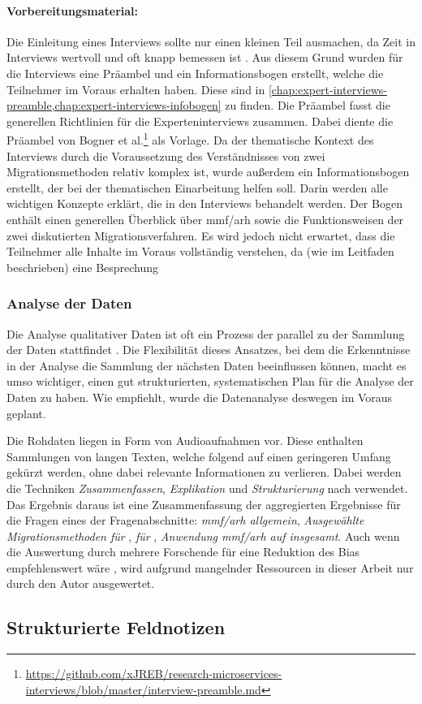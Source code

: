 \paragraph{Vorbereitungsmaterial:} 
Die Einleitung eines Interviews sollte nur einen kleinen Teil ausmachen, da Zeit in Interviews wertvoll und oft knapp bemessen ist \cite{Runeson2009,hove-anda-2005,seaman2008qualitative}.
Aus diesem Grund wurden für die Interviews eine Präambel und ein Informationsbogen erstellt, welche die Teilnehmer im Voraus erhalten haben.
Diese sind in \cref{chap:expert-interviews-preamble,chap:expert-interviews-infobogen} zu finden.
Die Präambel fasst die generellen Richtlinien für die Experteninterviews zusammen.
Dabei diente die Präambel von Bogner et al.\footnote{\url{https://github.com/xJREB/research-microservices-interviews/blob/master/interview-preamble.md}} als Vorlage.
Da der thematische Kontext des Interviews durch die Voraussetzung des Verständnisses von zwei Migrationsmethoden relativ komplex ist, wurde außerdem ein Informationsbogen erstellt, der bei der thematischen Einarbeitung helfen soll.
Darin werden alle wichtigen Konzepte erklärt, die in den Interviews behandelt werden.
Der Bogen enthält einen generellen Überblick über  \gls{mmf}/\gls{arh} sowie die Funktionsweisen der zwei diskutierten Migrationsverfahren. 
Es wird jedoch nicht erwartet, dass die Teilnehmer alle Inhalte im Voraus vollständig verstehen, da (wie im Leitfaden beschrieben) eine Besprechung 

\subsubsection{Analyse der Daten}

Die Analyse qualitativer Daten ist oft ein Prozess der parallel zu der Sammlung der Daten stattfindet \cite{Runeson2009}.
Die Flexibilität dieses Ansatzes, bei dem die Erkenntnisse in der Analyse die Sammlung der nächsten Daten beeinflussen können, macht es umso wichtiger, einen gut strukturierten, systematischen Plan für die Analyse der Daten zu haben.
Wie  empfiehlt, wurde die Datenanalyse deswegen im Voraus geplant.

Die Rohdaten liegen in Form von Audioaufnahmen vor. 
Diese enthalten Sammlungen von langen Texten, welche folgend auf einen geringeren Umfang gekürzt werden, ohne dabei relevante Informationen zu verlieren.
Dabei werden die Techniken \emph{Zusammenfassen}, \emph{Explikation} und \emph{Strukturierung} nach  verwendet.
Das Ergebnis daraus ist eine Zusammenfassung der aggregierten Ergebnisse für die Fragen eines der Fragenabschnitte: \emph{\gls{mmf}/\gls{arh} allgemein}, \emph{Ausgewählte Migrationsmethoden für \jf}, \emph{\bpp für \jf}, \emph{Anwendung \gls{mmf}/\gls{arh} auf \jf insgesamt}.
Auch wenn die Auswertung durch mehrere Forschende für eine Reduktion des Bias empfehlenswert wäre \cite{Runeson2009}, wird aufgrund mangelnder Ressourcen in dieser Arbeit nur durch den Autor ausgewertet.

\subsection{Strukturierte Feldnotizen}

